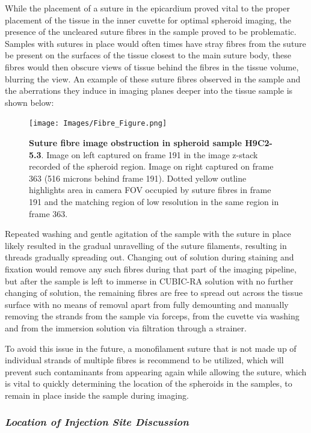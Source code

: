 While the placement of a suture in the epicardium proved vital to the proper placement of the tissue in the inner cuvette for optimal spheroid imaging, the presence of the uncleared suture fibres in the sample proved to be problematic. Samples with sutures in place would often times have stray fibres from the suture be present on the surfaces of the tissue closest to the main suture body, these fibres would then obscure views of tissue behind the fibres in the tissue volume, blurring the view. An example of these suture fibres observed in the sample and the aberrations they induce in imaging planes deeper into the tissue sample is shown below:

\begin{figure}[H]
\centering
\texttt{[image: Images/Fibre\_Figure.png]}
\caption{\textbf{Suture fibre image obstruction in spheroid sample H9C2-5.3}. Image on left captured on frame 191 in the image z-stack recorded of the spheroid region. Image on right captured on frame 363 (516 microns behind frame 191). Dotted yellow outline highlights area in camera FOV occupied by suture fibres in frame 191 and the matching region of low resolution in the same region in frame 363.}
\label{fig:enter-label}
\end{figure}
\medskip

Repeated washing and gentle agitation of the sample with the suture in place likely resulted in the gradual unravelling of the suture filaments, resulting in threads gradually spreading out. Changing out of solution during staining and fixation would remove any such fibres during that part of the imaging pipeline, but after the sample is left to immerse in CUBIC-RA solution with no further changing of solution, the remaining fibres are free to spread out across the tissue surface with no means of removal apart from fully demounting and manually removing the strands from the sample via forceps, from the cuvette via washing and from the immersion solution via filtration through a strainer.

To avoid this issue in the future, a monofilament suture that is not made up of individual strands of multiple fibres is recommend to be utilized, which will prevent such contaminants from appearing again while allowing the suture, which is vital to quickly determining the location of the spheroids in the samples, to remain in place inside the sample during imaging. 
    
\subsubsection{\textit{Location of Injection Site Discussion}}

